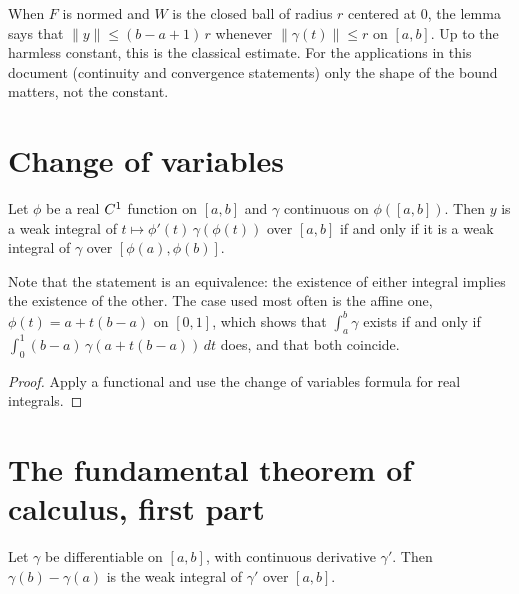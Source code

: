 \begin{remark}
  When $F$ is normed and $W$ is the closed ball of radius $r$ centered at $0$, the lemma says
  that $\|y\| \leq (b - a + 1)\, r$ whenever $\|\gamma(t)\| \leq r$ on $[a, b]$. Up to the
  harmless constant, this is the classical estimate. For the applications in this document
  (continuity and convergence statements) only the shape of the bound matters, not the
  constant.
\end{remark}

\section{Change of variables}

\begin{proposition}
  \label{prop:change-of-variables}
  \leanok
  Let $\phi$ be a real $C^{1}$ function on $[a, b]$ and $\gamma$ continuous on
  $\phi([a, b])$. Then $y$ is a weak integral of $t \mapsto \phi'(t)\,\gamma(\phi(t))$ over
  $[a, b]$ if and only if it is a weak integral of $\gamma$ over $[\phi(a), \phi(b)]$.
\end{proposition}

Note that the statement is an equivalence: the existence of either integral implies the
existence of the other. The case used most often is the affine one,
$\phi(t) = a + t(b - a)$ on $[0, 1]$, which shows that $\int_a^b \gamma$ exists if and only if
$\int_0^1 (b - a)\, \gamma(a + t(b - a))\, dt$ does, and that both coincide.

\begin{proof}
  \leanok
  Apply a functional and use the change of variables formula for real integrals.
\end{proof}

\section{The fundamental theorem of calculus, first part}

\begin{theorem}
  \label{thm:ftc1}
  \leanok
  Let $\gamma$ be differentiable on $[a, b]$, with continuous derivative $\gamma'$. Then
  $\gamma(b) - \gamma(a)$ is the weak integral of $\gamma'$ over $[a, b]$.
\end{theorem}


